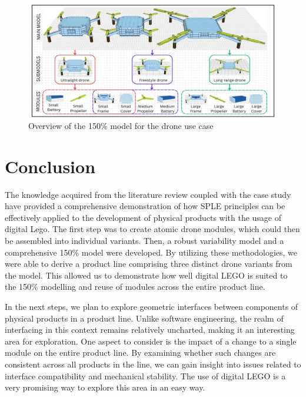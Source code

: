 \documentclass[sigconf,review,anonymous]{acmart}
\begin{document}
\begin{figure}[htbp]
    \includegraphics[width=\textwidth]{./150_MODEL_8.jpg}
    \caption{Overview of the 150\% model for the drone use case}
    \label{fig:150-model}
\end{figure}

\section{Conclusion}
\label{sec:conclusion}

The knowledge acquired from the literature review coupled with the case study have provided a comprehensive demonstration of how SPLE principles can be effectively applied to the development of physical products with the usage of digital Lego. 
The first step was to create atomic drone modules, which could then be assembled into individual variants. 
Then, a robust variability model and a comprehensive 150\% model were developed. 
By utilizing these methodologies, we were able to derive a product line comprising three distinct drone variants from the model. 
This allowed us to demonstrate how well digital LEGO is suited to the 150\% modelling and reuse of modules across the entire product line.

In the next steps, we plan to explore geometric interfaces between components of physical products in a product line. Unlike software engineering, the realm of interfacing in this context remains relatively uncharted, making it an interesting area for exploration. 
One aspect to consider is the impact of a change to a single module on the entire product line. 
By examining whether such changes are consistent across all products in the line, we can gain insight into issues related to interface compatibility and mechanical stability. 
The use of digital LEGO is a very promising way to explore this area in an easy way.



\end{document}
